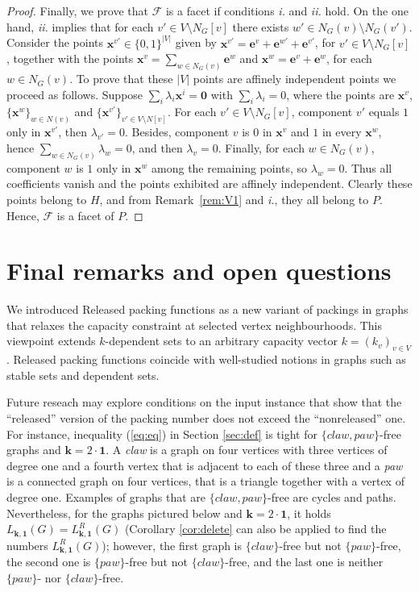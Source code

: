 \documentclass[preprint,12pt]{article}
\theoremstyle{definition}
\begin{document}
\begin{proof}
    Finally, we prove that $\mathcal{F}$ is a facet if conditions \textit{i.} and \textit{ii.} hold. 
    On the one hand, \textit{ii.} implies that for each $v'\in V\setminus N_G[v]$ there exists  $w'\in N_G(v)\setminus N_G(v')$. Consider the points $\mathbf{x}^{v'}\in\{0,1\}^{|V|}$ given by $\mathbf{x}^{v'}=\mathbf{e}^v+\mathbf{e}^{w'}+\mathbf{e}^{v'}$, for $v'\in V\setminus N_G[v]$, together with the points $\mathbf{x}^v=\sum_{w\in N_G(v)}\mathbf{e}^w$ and $\mathbf{x}^{w}=\mathbf{e}^v+\mathbf{e}^w$, for each $w\in N_G(v)$. To prove  that these $|V|$ points are affinely independent points we proceed as follows. Suppose $\sum_i\lambda_i \mathbf{x}^{i}= \mathbf{0}$ with
$\sum_i\lambda_i=0$, where the points are $\mathbf{x}^{v}$, $\{\mathbf{x}^{w}\}_{w\in N(v)}$ and
$\{\mathbf{x}^{v'}\}_{v'\in V\setminus N[v]}$. For each $v'\in V\setminus N_G[v]$, component
$v'$ equals $1$ only in $\mathbf{x}^{v'}$, then $\lambda_{v'}=0$. Besides, component $v$ is $0$ in
$\mathbf{x}^{v}$ and $1$ in every $\mathbf{x}^{w}$, hence $\sum_{w\in N_G(v)}\lambda_{w}=0$, and then
$\lambda_v=0$. Finally, for each $w\in N_G(v)$, component $w$ is $1$ only in
$\mathbf{x}^{w}$ among the remaining points, so $\lambda_w=0$. Thus all coefficients
vanish and the points exhibited are affinely independent. Clearly these points belong to $H$, and from Remark~\ref{rem:V1} and \textit{i.}, they all belong to $P$. Hence, $\mathcal{F}$ is a facet of $P$.

\end{proof}

\section{Final remarks and open questions}
We introduced Released packing functions as a new variant of packings in graphs that
relaxes the capacity constraint at selected vertex neighbourhoods. This viewpoint
extends $k$-dependent sets to an arbitrary capacity vector $k=(k_v)_{v\in V}$. Released packing functions coincide with
well-studied notions in graphs  such as stable sets and dependent sets.




 Future reseach may explore  conditions on the input instance that show that the ``released'' version of the  packing number does not exceed  the ``nonreleased'' one. For instance,  inequality (\ref{eq:eq}) in Section \ref{sec:def} is tight for 
  $\{claw, paw \}$-free  graphs  and $\mathbf{k}=2 \cdot \mathbf{1}$. A \emph{ claw} is a graph  on four vertices with three vertices of degree one and a fourth vertex that is adjacent to each of these three and a \emph{paw} is a connected graph on four vertices, that is a triangle together with a vertex of degree one.
Examples of graphs that are $\{claw, paw \}$-free are cycles and paths. Nevertheless, for the graphs pictured below  and  $\mathbf{k}=2\cdot \mathbf{1}$, it holds   $L_{\mathbf{k}, \mathbf{1}}(G) = L^R_{\mathbf{k}, \mathbf{1}}(G)$ (Corollary \ref{cor:delete} can also be applied to find the numbers $L^R_{\mathbf{k}, \mathbf{1} }(G)$); however, the first graph is $\{ claw\}$-free but not $\{ paw\}$-free, the second one is $\{ paw\}$-free but not $\{ claw\}$-free, and the last one is neither $\{ paw\}$- nor $\{ claw\}$-free.
\end{document}
